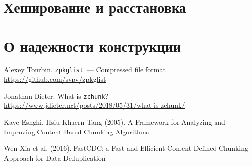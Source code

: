 \documentclass[russian,a4paper,12pt]{article}
\begin{document}
\section{Хеширование и расстановка}
\section{О надежности конструкции}

\begin{thebibliography}{9}

Alexey Tourbin. \verb|zpkglist|~--- Compressed file format\\
\url{https://github.com/svpv/zpkglist}

Jonathan Dieter. What is \verb|zchunk|?\\
\url{https://www.jdieter.net/posts/2018/05/31/what-is-zchunk/}

Kave Eshghi, Hsiu Khuern Tang (2005).
A Framework for Analyzing and Improving Content-Based Chunking Algorithms

Wen Xia et al. (2016).
FastCDC: a Fast and Efficient Content-Defined Chunking Approach for Data Deduplication

\end{thebibliography}
\end{document}
